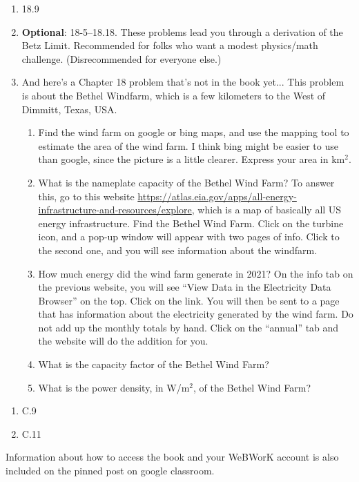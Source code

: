 \documentclass[12pt]{article}
\begin{document}
\begin{enumerate}
\setlength{\itemsep}{-1mm}
\item 18.9
\item {\bf Optional}: 18-5--18.18. These problems lead you through a
  derivation of the Betz Limit. Recommended for folks who want a
  modest physics/math challenge. (Disrecommended for everyone
  else.)
  \item And here's a Chapter 18 problem that's not in the book
    yet... This problem is about the Bethel Windfarm, which is a few
    kilometers to the West of Dimmitt, Texas, USA.
    \begin{enumerate}
      \item Find the wind farm on google or bing maps, and use the
        mapping tool to estimate the area of the wind farm. I think
        bing might be easier to use than google, since the picture is
        a little clearer.  Express your area in km$^2$.
        \item What is the nameplate capacity of the Bethel Wind Farm?
          To answer this, go to this website
          \url{https://atlas.eia.gov/apps/all-energy-infrastructure-and-resources/explore},
          which is a map of basically all US energy infrastructure.
          Find the Bethel Wind Farm.  Click on the turbine icon, and
          a pop-up window will appear with two pages of info. Click to
          the second one, and you will see information about the
          windfarm.
      \item How much energy did the wind farm generate in 2021? On the
        info tab on the previous website, you will see ``View Data in
        the Electricity Data Browser'' on the top.  Click on the
        link.  You will then be sent to a page that has information
        about the electricity generated by the wind farm. 
        Do not add up the monthly totals by hand. Click on the
        ``annual'' tab and the website will do the addition for you.
      \item What is the capacity factor of the Bethel Wind Farm?
        \item What is the power density, in W/m$^2$, of the Bethel
          Wind Farm?
    \end{enumerate}
    \end{enumerate}


\begin{enumerate}
  \setlength{\itemsep}{-1mm}
\item C.9
\item C.11\\ 
\end{enumerate}

\noindent Information about how to access the book and your WeBWorK
account is also included on the pinned post on google classroom. 
\end{document}
